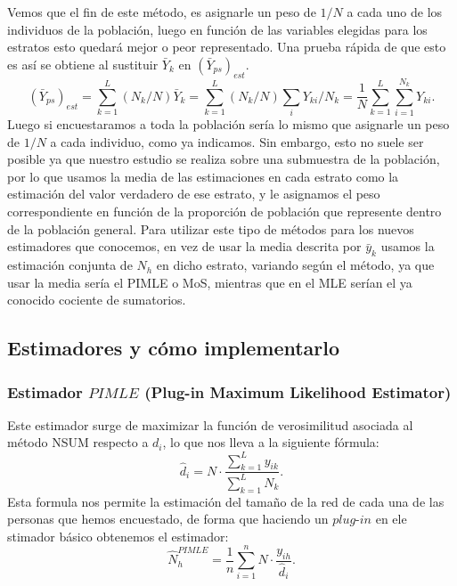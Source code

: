 \documentclass{article}
\begin{document}
Vemos que el fin de este método, es asignarle un peso de $1/N$ a cada uno de los individuos de la población, luego en función de las variables elegidas para los estratos esto quedará mejor o peor representado. Una prueba rápida de que esto es así se obtiene al sustituir $\bar{Y}_k$ en $(\bar{Y}_{ps})_{est}$. 
$$(\bar{Y}_{ps})_{est} = \sum_{k=1}^L (N_k/N) \bar{Y}_k = \sum_{k=1}^L (N_k/N) \sum_i Y_{ki}/N_k = \frac{1}{N}\sum_{k=1}^L \sum_{i=1}^{N_k} Y_{ki}.$$
Luego si encuestaramos a toda la población sería lo mismo que asignarle un peso de $1/N$ a cada individuo, como ya indicamos. Sin embargo, esto no suele ser posible ya que nuestro estudio se realiza sobre una submuestra de la población, por lo que usamos la media de las estimaciones en cada estrato como la estimación del valor verdadero de ese estrato, y le asignamos el peso correspondiente en función de la proporción de población que represente dentro de la población general. Para utilizar este tipo de métodos para los nuevos estimadores que conocemos, en vez de usar la media descrita por $\bar{y}_k$ usamos la estimación conjunta de $N_h$ en dicho estrato, variando según el método, ya que usar la media sería el PIMLE o MoS,  mientras que en el MLE serían el ya conocido cociente de sumatorios.

\subsection{Estimadores y cómo implementarlo}
\subsubsection{Estimador $PIMLE$ (Plug-in Maximum Likelihood Estimator)}
Este estimador surge de maximizar la función de verosimilitud asociada al método NSUM respecto a $d_i$, lo que nos lleva a la siguiente fórmula:
\begin{equation} \label{PIMLEdi}
    \hat{d}_i = N \cdot \frac{\sum_{k = 1}^Ly_{ik}}{\sum_{k = 1}^LN_k}.
\end{equation}
Esta formula nos permite la estimación del tamaño de la red de cada una de las personas que hemos encuestado, de forma que haciendo un $plug$-$in$ en ele stimador básico obtenemos el estimador:
\begin{equation} \label{PIMLE}
    \hat{N}_{h}^{PIMLE} = \frac{1}{n}\sum_{i=1}^{n}N\cdot\frac{y_{ih}}{\hat{d}_i}.
\end{equation}
\end{document}
